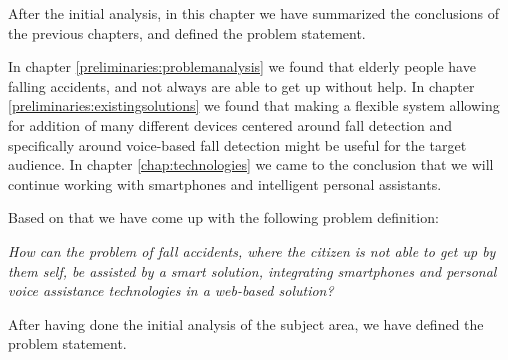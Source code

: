 \label{problemdefinition}

After the initial analysis, in this chapter we have summarized the conclusions of the previous chapters, and defined the problem statement.

In chapter \ref{preliminaries:problemanalysis} we found that elderly people have falling accidents, and not always are able to get up without help.
In chapter \ref{preliminaries:existingsolutions} we found that making a flexible system allowing for addition of many different devices centered around fall detection and specifically around voice-based fall detection might be useful for the target audience.
In chapter \ref{chap:technologies} we came to the conclusion that we will continue working with smartphones and intelligent personal assistants.


Based on that we have come up with the following problem definition:

\textit{How can the problem of fall accidents, where the citizen is not able to get up by them self, be assisted by a smart solution, integrating smartphones and personal voice assistance technologies in a web-based solution?}






















\iffalse

After having done the initial analysis of the subject area, we have defined the problem statement.

